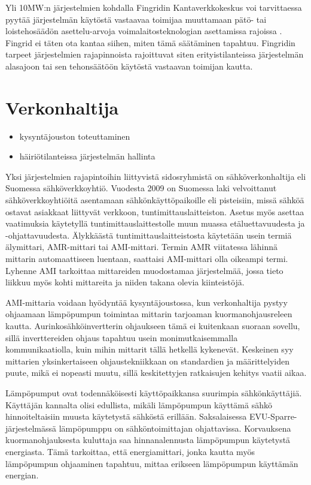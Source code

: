   Yli 10MW:n järjestelmien kohdalla Fingridin Kantaverkkokeskus voi tarvittaessa pyytää järjestelmän käytöstä vastaavaa toimijaa muuttamaan pätö- tai loistehosäädön asettelu-arvoja voimalaitosteknologian asettamissa rajoissa \parencite{VJV2018}. Fingrid ei täten ota kantaa siihen, miten tämä säätäminen tapahtuu. Fingridin tarpeet järjestelmien rajapinnoista rajoittuvat siten erityistilanteissa järjestelmän alasajoon tai sen tehonsäätöön käytöstä vastaavan toimijan kautta.

\section{Verkonhaltija}
  \begin{itemize}
    \item kysyntäjouston toteuttaminen
    \item häiriötilanteissa järjestelmän hallinta
  \end{itemize}

  Yksi järjestelmien rajapintoihin liittyvistä sidosryhmistä on sähköverkonhaltija eli Suomessa sähköverkkoyhtiö. Vuodesta 2009 on Suomessa laki velvoittanut sähköverkkoyhtiöitä asentamaan sähkönkäyttöpaikoille eli pisteisiin, missä sähköä ostavat asiakkaat liittyvät verkkoon, tuntimittauslaitteiston. Asetus myös asettaa vaatimuksia käytetyllä tuntimittauslaittestolle muun muassa etäluettavuudesta ja -ohjattavuudesta.\parencite{mittariAsetus} Älykkäästä tuntimittauslaitteistosta käytetään usein termiä älymittari, \gls{AMR}-mittari tai \gls{AMI}-mittari. Termin \gls{AMR} viitatessa lähinnä mittarin automaattiseen luentaan, saattaisi \gls{AMI}-mittari olla oikeampi termi. Lyhenne \gls{AMI} tarkoittaa mittareiden muodostamaa järjestelmää, jossa tieto liikkuu myös kohti mittareita ja niiden takana olevia kiinteistöjä.\parencite{dictOfEnergy}

  \gls{AMI}-mittaria voidaan hyödyntää kysyntäjoustossa, kun verkonhaltija pystyy ohjaamaan lämpöpumpun toimintaa mittarin tarjoaman kuormanohjausreleen kautta. Aurinkosähköinvertterin ohjaukseen tämä ei kuitenkaan suoraan sovellu, sillä inverttereiden ohjaus tapahtuu usein monimutkaisemmalla kommunikaatiolla, kuin mihin mittarit tällä hetkellä kykenevät. Keskeinen syy mittarien yksinkertaiseen ohjaustekniikkaan on standardien ja määrittelyiden puute, mikä ei nopeasti muutu, sillä keskitettyjen ratkaisujen kehitys vaatii aikaa.

  Lämpöpumput ovat todennäköisesti käyttöpaikkansa suurimpia sähkönkäyttäjiä. Käyttäjän kannalta olisi edullista, mikäli lämpöpumpun käyttämä sähkö hinnoiteltaisiin muusta käytetystä sähköstä erillään. Saksalaisessa EVU-Sparre-järjestelmässä lämpöpumppu on sähköntoimittajan ohjattavissa. Korvauksena kuormanohjauksesta kuluttaja saa hinnanalennusta lämpöpumpun käytetystä energiasta. Tämä tarkoittaa, että energiamittari, jonka kautta myös lämpöpumpun ohjaaminen tapahtuu, mittaa erikseen lämpöpumpun käyttämän energian.\parencite{enwg, VDEARN4100}

